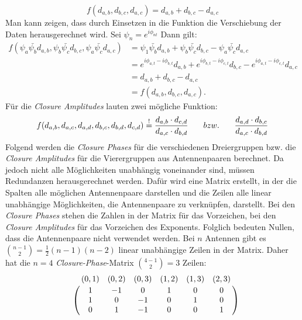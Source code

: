 \begin{equation}f(d_{a,b},d_{b,c},d_{a,c})=d_{a,b}+d_{b,c}-d_{a,c}\end{equation}
Man kann zeigen, dass durch Einsetzen in die Funktion die Verschiebung der Daten herausgerechnet wird. 
Sei $\psi_n = e^{i \phi_{nt}}$ Dann gilt:
\begin{align}
f(\psi_a\bar{\psi_b} d_{a,b},\psi_b\bar{\psi_c}d_{b,c},\psi_a \bar{\psi_c} d_{a,c})&=\psi_1\bar{\psi_b}d_{a,b}+\psi_b\bar{\psi_c}d_{b,c}-\psi_a \bar{\psi_c} d_{a,c}\\
&=e^{i \phi_{a,t}-i\phi_{b,t}}d_{a,b}+e^{i \phi_{b,t}-i\phi_{c,t}}d_{b,c}-e^{i \phi_{a,t}-i\phi_{c,t}}d_{a,c}\\
&=d_{a,b}+d_{b,c}-d_{a,c}\\
&=f(d_{a,b},d_{b,c},d_{a,c}).
\end{align}
Für die \emph{Closure Amplitudes} lauten zwei mögliche Funktion:
\begin{align}
f(d_{a, b},d_{a, c},d_{a, d},d_{b, c},d_{b, d},d_{c, d})\overset{!}{=}\frac{d_{a,b}\cdot d_{c,d}}{d_{a,c} \cdot d_{b,d}}
\hspace{3mm}\text \quad {bzw.} \quad \hspace{3mm} \frac{d_{a,d}\cdot d_{b,c}}{d_{a,c} \cdot d_{b,d}}
\end{align}
Folgend werden die \emph{Closure Phases} für die verschiedenen Dreiergruppen bzw. die \emph{Closure Amplitudes} für die Vierergruppen aus Antennenpaaren berechnet. Da jedoch nicht alle Möglichkeiten unabhängig voneinander sind, müssen Redundanzen herausgerechnet werden.
Dafür wird eine Matrix erstellt, in der die Spalten alle möglichen Antennenpaare darstellen und die Zeilen alle linear unabhängige Möglichkeiten, die Antennenpaare zu verknüpfen, darstellt. Bei den  \emph{Closure Phases} stehen die Zahlen in der Matrix für das Vorzeichen, bei den \emph{Closure Amplitudes} für das Vorzeichen des Exponents. Folglich bedeuten Nullen, dass die Antennenpaare nicht verwendet werden.  Bei $n$ Antennen gibt es $\binom{n-1}{2}= \frac{1}{2}(n-1)(n-2)$ linear unabhängige Zeilen in der Matrix. 
Daher hat die $n=4$ \emph{Closure-Phase}-Matrix $\binom{4-1}{2}=3$ Zeilen:
\begin{equation}
\bordermatrix{
~ &(0,1)&(0,2)&(0,3)&(1,2)&(1,3)&(2,3)\cr
~&1&-1&0&1&0&0 \cr
~&1&0&-1&0&1&0 \cr
~&0&1&-1&0&0&1 \cr}
\end{equation}

